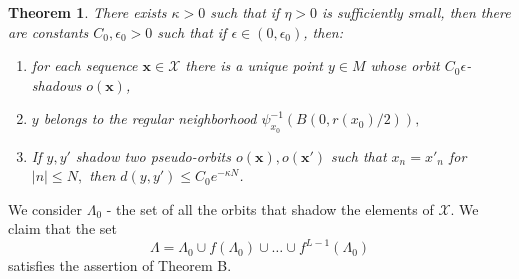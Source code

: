 \documentclass{amsart}
\theoremstyle{plain}
\newtheorem{thm}{Theorem}[section]
\newtheorem{lem}[thm]{Lemma}
\theoremstyle{definition}
\theoremstyle{remark}
\numberwithin{equation}{section}
\begin{document}
\begin{thm}\label{thm:shad}
There exists $\kappa>0$ such that if $\eta>0$ is sufficiently small, then there are constants  $C_0,\epsilon_0>0$ such that if $\epsilon\in (0,\epsilon_0)$, then:
\begin{enumerate}
\item for each sequence   $\textbf{x}\in \mathcal{X}$ there is a unique point $y\in M$ whose orbit $C_0\epsilon$-shadows $o(\textbf{x})$,
\item $y$ belongs to the regular neighborhood $\psi^{-1}_{x_0}(B(0, r(x_0)/2)),$
\item If $y,y'$ shadow two pseudo-orbits $o(\textbf{x}), o(\textbf{x}')$ such that $x_n=x'_n$ for $|n|\leq N,$ then $d(y,y')\leq C_0 e ^{-\kappa N}$.
\end{enumerate}
\end{thm}
We consider $\Lambda_0$ - the set of all the orbits that shadow the elements of $\mathcal{X}$.
We claim that the set  $$\Lambda= \Lambda_0 \cup f(\Lambda_0)\cup \ldots \cup f^{L-1}(\Lambda_0)$$ satisfies the assertion of Theorem B.


\end{document}
